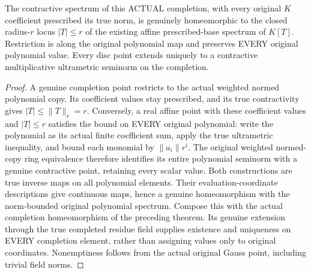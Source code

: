 \begin{theorem}
\label{analytic:actual-gauss-completion-disc-homeomorphism}
\leanok
{}
The contractive spectrum of this ACTUAL completion, with every
original $K$ coefficient prescribed its true norm, is genuinely
homeomorphic to the closed radius-$r$ locus $|T|\leq r$ of the
existing affine prescribed-base spectrum of $K[T]$. Restriction
is along the original polynomial map and preserves EVERY original
polynomial value. Every disc point extends uniquely to a
contractive multiplicative ultrametric seminorm on the completion.
\end{theorem}
\begin{proof}
A genuine completion point restricts to the actual weighted
normed polynomial copy. Its coefficient values stay prescribed,
and its true contractivity gives $|T|\leq\|T\|_r=r$.
Conversely, a real affine point with these coefficient values
and $|T|\leq r$ satisfies the bound on EVERY original polynomial:
write the polynomial as its actual finite coefficient sum,
apply the true ultrametric inequality, and bound each monomial
by $\|a_i\|r^i$. The original weighted normed-copy ring
equivalence therefore identifies its entire polynomial seminorm
with a genuine contractive point, retaining every scalar value.
Both constructions are true inverse maps on all polynomial
elements. Their evaluation-coordinate descriptions give continuous
maps, hence a genuine homeomorphism with the norm-bounded original
polynomial spectrum. Compose this with the actual completion
homeomorphism of the preceding theorem. Its genuine extension
through the true completed residue field supplies existence and
uniqueness on EVERY completion element, rather than assigning
values only to original coordinates. Nonemptiness follows from
the actual original Gauss point, including trivial field norms.
\end{proof}

